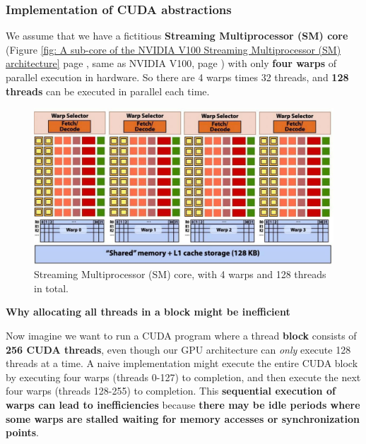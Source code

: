 \subsubsection{Implementation of CUDA abstractions}

We assume that we have a fictitious \textbf{Streaming Multiprocessor (SM) core} (Figure \ref{fig: A sub-core of the NVIDIA V100 Streaming Multiprocessor (SM) architecture} page \pageref{fig: A sub-core of the NVIDIA V100 Streaming Multiprocessor (SM) architecture}, same as NVIDIA V100, page \pageref{subsubsection: NVIDIA V100 Streaming Multiprocessor (SM)}) with only \textbf{four warps} of parallel execution in hardware. So there are 4 warps times 32 threads, and \textbf{128 threads} can be executed in parallel each time.

\begin{figure}[!htp]
    \centering
    \includegraphics[width=\textwidth]{img/cuda-abs-1.pdf}
    \caption{Streaming Multiprocessor (SM) core, with 4 warps and 128 threads in total.}
\end{figure}

\begin{flushleft}
    \textcolor{Green3}{ \textbf{Why allocating all threads in a block might be inefficient}}
\end{flushleft}
Now imagine we want to run a CUDA program where a thread \textbf{block} consists of \textbf{256 CUDA threads}, even though our GPU architecture can \emph{only} execute 128 threads at a time. A naive implementation might execute the entire CUDA block by executing four warps (threads 0-127) to completion, and then execute the next four warps (threads 128-255) to completion. This \textbf{sequential execution of warps can lead to inefficiencies} because \textbf{there may be idle periods where some warps are stalled waiting for memory accesses or synchronization points}.

